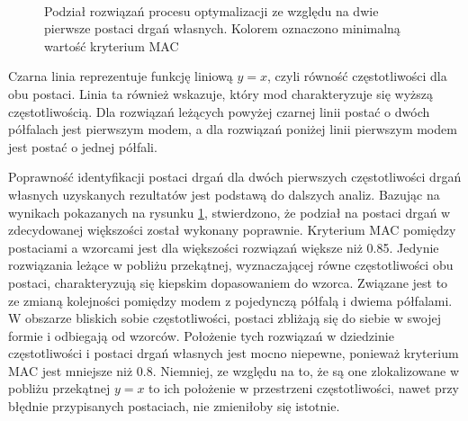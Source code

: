 \begin{figure}[hbt!]
	\centering
	 \\
	
	\caption{Podział rozwiązań procesu optymalizacji ze względu na dwie pierwsze postaci drgań własnych. Kolorem oznaczono minimalną wartość kryterium MAC}
	\label{fig:minimum_mac_values_shape_division}
\end{figure}

Czarna linia reprezentuje funkcję liniową $y=x$, czyli równość częstotliwości dla obu postaci. Linia ta również wskazuje, który mod charakteryzuje się wyższą częstotliwością. Dla rozwiązań leżących powyżej czarnej linii postać o dwóch półfalach jest pierwszym modem, a dla rozwiązań poniżej linii pierwszym modem jest postać o jednej półfali.

Poprawność identyfikacji postaci drgań dla dwóch pierwszych częstotliwości drgań własnych uzyskanych rezultatów jest podstawą do dalszych analiz. Bazując na wynikach pokazanych na rysunku \ref{fig:minimum_mac_values_shape_division}, stwierdzono, że podział na postaci drgań w zdecydowanej większości został wykonany poprawnie. Kryterium MAC pomiędzy postaciami a wzorcami jest dla większości rozwiązań większe niż 0.85. Jedynie rozwiązania leżące w pobliżu przekątnej, wyznaczającej równe częstotliwości obu postaci, charakteryzują się kiepskim dopasowaniem do wzorca. Związane jest to ze zmianą kolejności pomiędzy modem z pojedynczą półfalą i dwiema półfalami. W obszarze bliskich sobie częstotliwości, postaci zbliżają się do siebie w swojej formie i odbiegają od wzorców. Położenie tych rozwiązań w dziedzinie częstotliwości i postaci drgań własnych jest mocno niepewne, ponieważ kryterium MAC jest mniejsze niż 0.8. Niemniej, ze względu na to, że są one zlokalizowane w pobliżu przekątnej $y=x$ to ich położenie w przestrzeni częstotliwości, nawet przy błędnie przypisanych postaciach, nie zmieniłoby się istotnie. 

